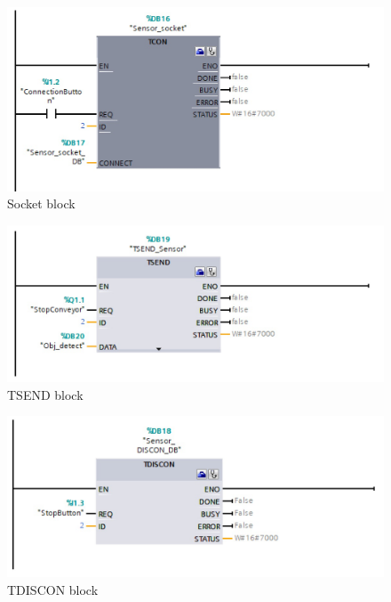 \documentclass[a4paper,11pt]{report}
\theoremstyle{definition}
\theoremstyle{plain}
\begin{document}
        \begin{figure}[H]
        \includegraphics[scale=0.3]{images/SENSOR_SOCKET.jpeg}
        \centering
        \caption{Socket block}
        \label{sensor_socket}
        \end{figure}

        \begin{figure}[H]
        \includegraphics[scale=0.3]{images/TSEND.jpeg}
        \centering
        \caption{TSEND block}
        \label{tsend}
        \end{figure}

        \begin{figure}[H]
        \includegraphics[scale=0.3]{images/TDISCON.jpeg}
        \centering
        \caption{TDISCON block}
        \label{tdiscon}
        \end{figure}
        
\end{document}
